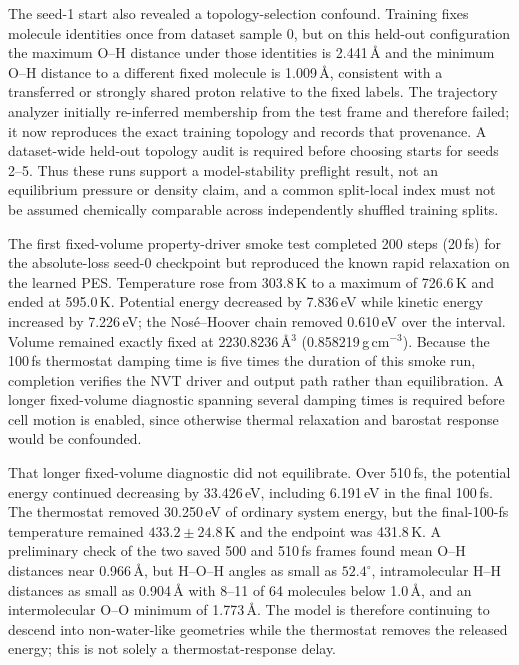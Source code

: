 \documentclass[11pt]{article}
\begin{document}
The seed-1 start also revealed a topology-selection confound. Training fixes
molecule identities once from dataset sample 0, but on this held-out
configuration the maximum O--H distance under those identities is
2.441\,\AA{} and the minimum O--H distance to a different fixed molecule is
1.009\,\AA, consistent with a transferred or strongly shared proton relative
to the fixed labels. The trajectory analyzer initially re-inferred membership
from the test frame and therefore failed; it now reproduces the exact training
topology and records that provenance. A dataset-wide held-out topology audit
is required before choosing starts for seeds 2--5. Thus these runs support a
model-stability preflight result, not an equilibrium pressure or density
claim, and a common split-local index must not be assumed chemically
comparable across independently shuffled training splits.

The first fixed-volume property-driver smoke test completed 200 steps
(20\,fs) for the absolute-loss seed-0 checkpoint but reproduced the known
rapid relaxation on the learned PES. Temperature rose from 303.8\,K to a
maximum of 726.6\,K and ended at 595.0\,K. Potential energy decreased by
7.836\,eV while kinetic energy increased by 7.226\,eV; the Nos\'e--Hoover
chain removed 0.610\,eV over the interval. Volume remained exactly fixed at
2230.8236\,\AA$^3$ (0.858219\,g\,cm$^{-3}$). Because the 100\,fs thermostat
damping time is five times the duration of this smoke run, completion verifies
the NVT driver and output path rather than equilibration. A longer fixed-volume
diagnostic spanning several damping times is required before cell motion is
enabled, since otherwise thermal relaxation and barostat response would be
confounded.

That longer fixed-volume diagnostic did not equilibrate. Over 510\,fs, the
potential energy continued decreasing by 33.426\,eV, including 6.191\,eV in
the final 100\,fs. The thermostat removed 30.250\,eV of ordinary system
energy, but the final-100-fs temperature remained
$433.2\pm24.8$\,K and the endpoint was 431.8\,K. A preliminary check of the
two saved 500 and 510\,fs frames found mean O--H distances near 0.966\,\AA,
but H--O--H angles as small as $52.4^\circ$, intramolecular H--H distances
as small as 0.904\,\AA{} with 8--11 of 64 molecules below 1.0\,\AA, and an
intermolecular O--O minimum of 1.773\,\AA. The model is therefore continuing
to descend into non-water-like geometries while the thermostat removes the
released energy; this is not solely a thermostat-response delay.
\end{document}
